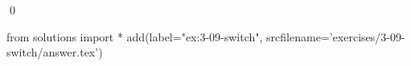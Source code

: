 
\begin{ex}
  \label{ex:3-09-switch}
  
  \qed
\end{ex}
\begin{python0}
from solutions import *
add(label="ex:3-09-switch",
    srcfilename='exercises/3-09-switch/answer.tex')
\end{python0}
